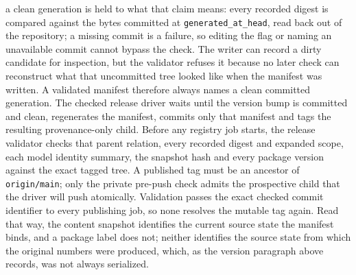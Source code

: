 a clean generation is held to what that claim means: every recorded digest is compared against the bytes committed at \texttt{generated\_at\_head}, read back out of the repository; a missing commit is a failure, so editing the flag or naming an unavailable commit cannot bypass the check. The writer can record a dirty candidate for inspection, but the validator refuses it because no later check can reconstruct what that uncommitted tree looked like when the manifest was written. A validated manifest therefore always names a clean committed generation. The checked release driver waits until the version bump is committed and clean, regenerates the manifest, commits only that manifest and tags the resulting provenance-only child. Before any registry job starts, the release validator checks that parent relation, every recorded digest and expanded scope, each model identity summary, the snapshot hash and every package version against the exact tagged tree. A published tag must be an ancestor of \texttt{origin/main}; only the private pre-push check admits the prospective child that the driver will push atomically. Validation passes the exact checked commit identifier to every publishing job, so none resolves the mutable tag again. Read that way, the content snapshot identifies the current source state the manifest binds, and a package label does not; neither identifies the source state from which the original numbers were produced, which, as the version paragraph above records, was not always serialized.

